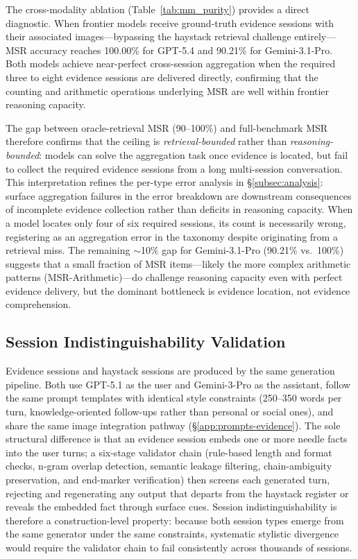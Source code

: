 \documentclass{llmxive}
\begin{document}
The cross-modality ablation (Table~\ref{tab:mm_purity}) provides a direct diagnostic. When frontier models receive ground-truth evidence sessions with their associated images---bypassing the haystack retrieval challenge entirely---MSR accuracy reaches 100.00\% for GPT-5.4 and 90.21\% for Gemini-3.1-Pro. Both models achieve near-perfect cross-session aggregation when the required three to eight evidence sessions are delivered directly, confirming that the counting and arithmetic operations underlying MSR are well within frontier reasoning capacity.

The gap between oracle-retrieval MSR (90--100\%) and full-benchmark MSR therefore confirms that the ceiling is \emph{retrieval-bounded} rather than \emph{reasoning-bounded}: models can solve the aggregation task once evidence is located, but fail to collect the required evidence sessions from a long multi-session conversation. This interpretation refines the per-type error analysis in \S\ref{subsec:analysis}: surface aggregation failures in the error breakdown are downstream consequences of incomplete evidence collection rather than deficits in reasoning capacity. When a model locates only four of six required sessions, its count is necessarily wrong, registering as an aggregation error in the taxonomy despite originating from a retrieval miss. The remaining ${\sim}$10\% gap for Gemini-3.1-Pro (90.21\% vs.\ 100\%) suggests that a small fraction of MSR items---likely the more complex arithmetic patterns (MSR-Arithmetic)---do challenge reasoning capacity even with perfect evidence delivery, but the dominant bottleneck is evidence location, not evidence comprehension.


\subsection{Session Indistinguishability Validation}
\label{app:indistinguishability}

Evidence sessions and haystack sessions are produced by the same generation pipeline. Both use GPT-5.1 as the user and Gemini-3-Pro as the assistant, follow the same prompt templates with identical style constraints (250--350 words per turn, knowledge-oriented follow-ups rather than personal or social ones), and share the same image integration pathway (\S\ref{app:prompts-evidence}). The sole structural difference is that an evidence session embeds one or more needle facts into the user turns; a six-stage validator chain (rule-based length and format checks, n-gram overlap detection, semantic leakage filtering, chain-ambiguity preservation, and end-marker verification) then screens each generated turn, rejecting and regenerating any output that departs from the haystack register or reveals the embedded fact through surface cues. Session indistinguishability is therefore a construction-level property: because both session types emerge from the same generator under the same constraints, systematic stylistic divergence would require the validator chain to fail consistently across thousands of sessions.
\end{document}
